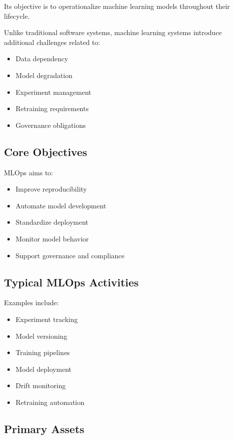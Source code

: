 Its objective is to operationalize machine learning models throughout their lifecycle.

Unlike traditional software systems, machine learning systems introduce additional challenges related to:

\begin{itemize}
    \item Data dependency
    \item Model degradation
    \item Experiment management
    \item Retraining requirements
    \item Governance obligations
\end{itemize}

\subsection{Core Objectives}

MLOps aims to:

\begin{itemize}
    \item Improve reproducibility
    \item Automate model development
    \item Standardize deployment
    \item Monitor model behavior
    \item Support governance and compliance
\end{itemize}

\subsection{Typical MLOps Activities}

Examples include:

\begin{itemize}
    \item Experiment tracking
    \item Model versioning
    \item Training pipelines
    \item Model deployment
    \item Drift monitoring
    \item Retraining automation
\end{itemize}

\subsection{Primary Assets}

